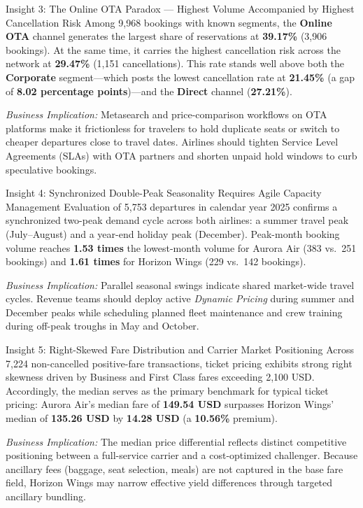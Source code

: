 \documentclass[12pt, a4paper]{report}
\newcommand{\pct}[1]{\textbf{#1\%}}
\begin{document}
\begin{insightbox}{Insight 3: The Online OTA Paradox --- Highest Volume Accompanied by Highest Cancellation Risk}
Among 9,968 bookings with known segments, the \textbf{Online OTA} channel generates the largest share of reservations at \pct{39.17} (3,906 bookings). At the same time, it carries the highest cancellation risk across the network at \pct{29.47} (1,151 cancellations). This rate stands well above both the \textbf{Corporate} segment---which posts the lowest cancellation rate at \pct{21.45} (a gap of \textbf{8.02 percentage points})---and the \textbf{Direct} channel (\pct{27.21}).

\textit{Business Implication:} Metasearch and price-comparison workflows on OTA platforms make it frictionless for travelers to hold duplicate seats or switch to cheaper departures close to travel dates. Airlines should tighten Service Level Agreements (SLAs) with OTA partners and shorten unpaid hold windows to curb speculative bookings.
\end{insightbox}

\begin{insightbox}{Insight 4: Synchronized Double-Peak Seasonality Requires Agile Capacity Management}
Evaluation of 5,753 departures in calendar year 2025 confirms a synchronized two-peak demand cycle across both airlines: a summer travel peak (July--August) and a year-end holiday peak (December). Peak-month booking volume reaches \textbf{1.53 times} the lowest-month volume for Aurora Air (383 vs.\ 251 bookings) and \textbf{1.61 times} for Horizon Wings (229 vs.\ 142 bookings).

\textit{Business Implication:} Parallel seasonal swings indicate shared market-wide travel cycles. Revenue teams should deploy active \textit{Dynamic Pricing} during summer and December peaks while scheduling planned fleet maintenance and crew training during off-peak troughs in May and October.
\end{insightbox}

\begin{insightbox}{Insight 5: Right-Skewed Fare Distribution and Carrier Market Positioning}
Across 7,224 non-cancelled positive-fare transactions, ticket pricing exhibits strong right skewness driven by Business and First Class fares exceeding 2,100 USD. Accordingly, the median serves as the primary benchmark for typical ticket pricing: Aurora Air's median fare of \textbf{149.54 USD} surpasses Horizon Wings' median of \textbf{135.26 USD} by \textbf{14.28 USD} (a \pct{10.56} premium).

\textit{Business Implication:} The median price differential reflects distinct competitive positioning between a full-service carrier and a cost-optimized challenger. Because ancillary fees (baggage, seat selection, meals) are not captured in the base fare field, Horizon Wings may narrow effective yield differences through targeted ancillary bundling.
\end{insightbox}
\end{document}
